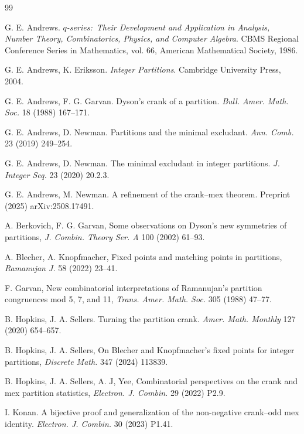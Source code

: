 \documentclass{amsart}
\theoremstyle{theorem}
\theoremstyle{definition}
\begin{document}
\begin{thebibliography}{99}

G. E. Andrews.  \emph{$q$-series:\ Their Development and Application in Analysis, Number Theory, Combinatorics, Physics, and Computer Algebra}.  CBMS Regional Conference Series in Mathematics, vol. 66, American Mathematical Society, 1986.

G. E. Andrews, K. Eriksson. \emph{Integer Partitions}.  Cambridge University Press, 2004.

G. E. Andrews, F. G. Garvan. Dyson's crank of a partition.  \emph{Bull. Amer. Math. Soc.} 18 (1988) 167--171.  

G. E. Andrews, D. Newman.  Partitions and the minimal excludant. \emph{Ann. Comb.} 23 (2019) 249--254.

G. E. Andrews, D. Newman. The minimal excludant in integer partitions. \emph{J. Integer Seq.} 23 (2020) 20.2.3.

G. E. Andrews, M. Newman. A refinement of the crank--mex theorem. Preprint (2025) arXiv:2508.17491.

A. Berkovich, F. G. Garvan, Some observations on Dyson's new symmetries of partitions, \textit{J. Combin. Theory Ser. A} 100 (2002) 61--93.

A. Blecher, A. Knopfmacher,  Fixed points and matching points in partitions, \emph{Ramanujan J.} 58 (2022) 23--41.

F. Garvan, New combinatorial interpretations of Ramanujan's partition congruences mod 5, 7, and 11, \emph{Trans. Amer. Math. Soc.} 305 (1988) 47--77.

B. Hopkins, J. A. Sellers. Turning the partition crank. \emph{Amer. Math. Monthly} 127 (2020) 654--657.

B. Hopkins, J. A. Sellers,  On Blecher and Knopfmacher's fixed points for integer partitions, \emph{Discrete Math.} 347 (2024) 113839.

B. Hopkins, J. A. Sellers, A. J, Yee, Combinatorial perspectives on the crank and mex partition statistics, \emph{Electron. J. Combin.} 29 (2022) P2.9.

I. Konan.  A bijective proof and generalization of the non-negative crank--odd mex identity.  \emph{Electron. J. Combin.} 30 (2023) P1.41.

\end{thebibliography}
\end{document}
